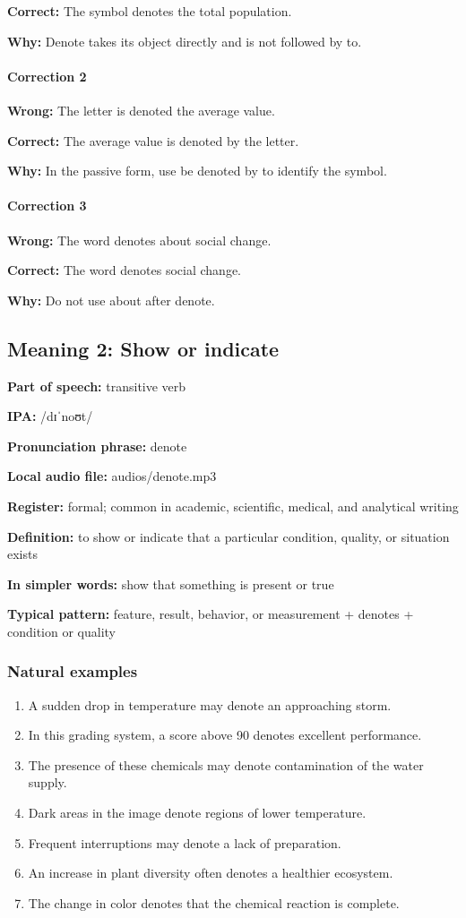 \documentclass[11pt]{article}
\begin{document}
\textbf{Correct:} The symbol denotes the total population.

\textbf{Why:} Denote takes its object directly and is not followed by to.

\paragraph{Correction 2}
\textbf{Wrong:} The letter is denoted the average value.

\textbf{Correct:} The average value is denoted by the letter.

\textbf{Why:} In the passive form, use be denoted by to identify the symbol.

\paragraph{Correction 3}
\textbf{Wrong:} The word denotes about social change.

\textbf{Correct:} The word denotes social change.

\textbf{Why:} Do not use about after denote.

\subsection{Meaning 2: Show or indicate}
\textbf{Part of speech:} transitive verb

\textbf{IPA:} /dɪˈnoʊt/

\textbf{Pronunciation phrase:} denote

\textbf{Local audio file:} audios/denote.mp3

\textbf{Register:} formal; common in academic, scientific, medical, and analytical writing

\textbf{Definition:} to show or indicate that a particular condition, quality, or situation exists

\textbf{In simpler words:} show that something is present or true

\textbf{Typical pattern:} feature, result, behavior, or measurement + denotes + condition or quality

\subsubsection{Natural examples}
\begin{enumerate}
  \item A sudden drop in temperature may denote an approaching storm.
  \item In this grading system, a score above 90 denotes excellent performance.
  \item The presence of these chemicals may denote contamination of the water supply.
  \item Dark areas in the image denote regions of lower temperature.
  \item Frequent interruptions may denote a lack of preparation.
  \item An increase in plant diversity often denotes a healthier ecosystem.
  \item The change in color denotes that the chemical reaction is complete.
\end{enumerate}
\end{document}
